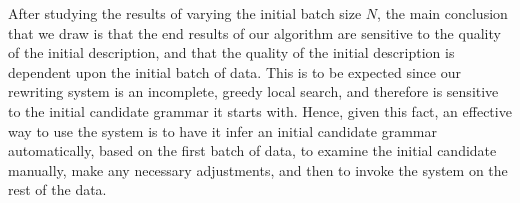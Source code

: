 
After studying the results of varying the initial batch size $N$,
the main conclusion that we draw is that the end results of our algorithm are
sensitive to the quality of the initial description, and that the quality
of the initial description is dependent upon the initial batch of data.
This is to be expected since our rewriting system is an incomplete, greedy local search,
and therefore is sensitive to the initial candidate grammar it starts with.
Hence, given this fact, an effective way to use the system is to have it infer an 
initial candidate grammar automatically, based on the first batch of data,
to examine the initial candidate manually, make any necessary adjustments, 
and then to invoke the system on the rest of the data.


